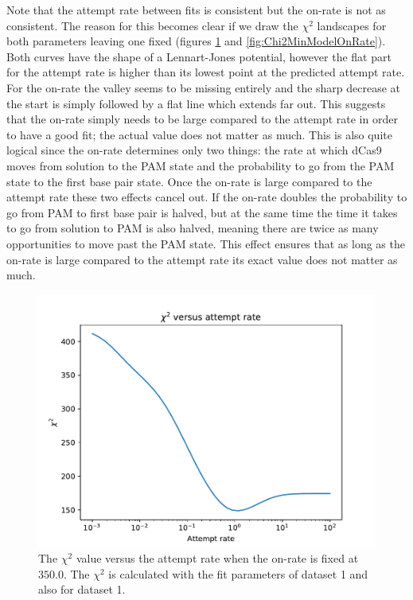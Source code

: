 Note that the attempt rate between fits is consistent but the on-rate is not as consistent. The reason for this becomes clear if we draw the $\chi^2$ landscapes for both parameters leaving one fixed (figures \ref{fig:Chi2MinModelAttemptRate} and \ref{fig:Chi2MinModelOnRate}). Both curves have the shape of a Lennart-Jones potential, however the flat part for the attempt rate is higher than its lowest point at the predicted attempt rate. For the on-rate the valley seems to be missing entirely and the sharp decrease at the start is simply followed by a flat line which extends far out. This suggests that the on-rate simply needs to be large compared to the attempt rate in order to have a good fit; the actual value does not matter as much. This is also quite logical since the on-rate determines only two things: the rate at which dCas9 moves from solution to the PAM state and the probability to go from the PAM state to the first base pair state. Once the on-rate is large compared to the attempt rate these two effects cancel out. If the on-rate doubles the probability to go from PAM to first base pair is halved, but at the same time the time it takes to go from solution to PAM is also halved, meaning there are twice as many opportunities to move past the PAM state. This effect ensures that as long as the on-rate is large compared to the attempt rate its exact value does not matter as much.

\begin{figure}
\begin{center}
\includegraphics[width=\textwidth]{images/Dataset1AttemptRateOnRate=350}
\caption{The $\chi^2$ value versus the attempt rate when the on-rate is fixed at $350.0$. The $\chi^2$ is calculated with the fit parameters of dataset 1 and also for dataset 1.}
\label{fig:Chi2MinModelAttemptRate}
\end{center}
\end{figure}

